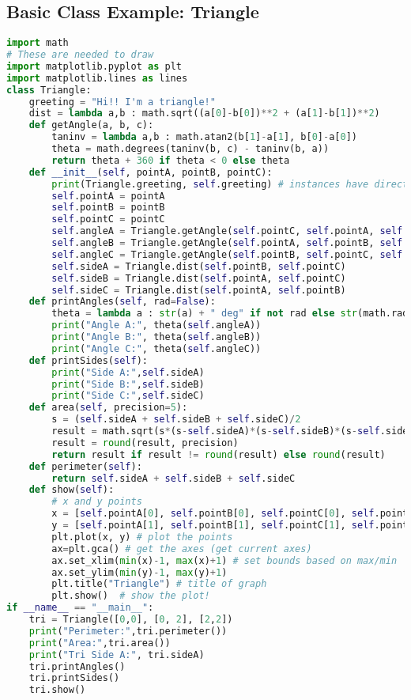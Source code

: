 \documentclass[12pt, twoside, reqno]{book}
\begin{document}
\subsection{Basic Class Example: Triangle}
\begin{lstlisting}[language=Python]
import math
# These are needed to draw
import matplotlib.pyplot as plt 
import matplotlib.lines as lines
class Triangle:
    greeting = "Hi!! I'm a triangle!"
    dist = lambda a,b : math.sqrt((a[0]-b[0])**2 + (a[1]-b[1])**2)
    def getAngle(a, b, c):
        taninv = lambda a,b : math.atan2(b[1]-a[1], b[0]-a[0])
        theta = math.degrees(taninv(b, c) - taninv(b, a))
        return theta + 360 if theta < 0 else theta
    def __init__(self, pointA, pointB, pointC):
        print(Triangle.greeting, self.greeting) # instances have direct access to class variables
        self.pointA = pointA
        self.pointB = pointB
        self.pointC = pointC
        self.angleA = Triangle.getAngle(self.pointC, self.pointA, self.pointB)
        self.angleB = Triangle.getAngle(self.pointA, self.pointB, self.pointC)
        self.angleC = Triangle.getAngle(self.pointB, self.pointC, self.pointA)
        self.sideA = Triangle.dist(self.pointB, self.pointC)
        self.sideB = Triangle.dist(self.pointA, self.pointC)
        self.sideC = Triangle.dist(self.pointA, self.pointB)
    def printAngles(self, rad=False):
        theta = lambda a : str(a) + " deg" if not rad else str(math.radians(a)) + " rad"
        print("Angle A:", theta(self.angleA))
        print("Angle B:", theta(self.angleB))
        print("Angle C:", theta(self.angleC))
    def printSides(self):
        print("Side A:",self.sideA)
        print("Side B:",self.sideB)
        print("Side C:",self.sideC)
    def area(self, precision=5):
        s = (self.sideA + self.sideB + self.sideC)/2
        result = math.sqrt(s*(s-self.sideA)*(s-self.sideB)*(s-self.sideC))
        result = round(result, precision)
        return result if result != round(result) else round(result)
    def perimeter(self):
        return self.sideA + self.sideB + self.sideC
    def show(self):        
        # x and y points
        x = [self.pointA[0], self.pointB[0], self.pointC[0], self.pointA[0]]
        y = [self.pointA[1], self.pointB[1], self.pointC[1], self.pointA[1]]
        plt.plot(x, y) # plot the points
        ax=plt.gca() # get the axes (get current axes)
        ax.set_xlim(min(x)-1, max(x)+1) # set bounds based on max/min
        ax.set_ylim(min(y)-1, max(y)+1)
        plt.title("Triangle") # title of graph
        plt.show()  # show the plot!
if __name__ == "__main__":
    tri = Triangle([0,0], [0, 2], [2,2])
    print("Perimeter:",tri.perimeter())
    print("Area:",tri.area())
    print("Tri Side A:", tri.sideA)
    tri.printAngles()
    tri.printSides()
    tri.show()
\end{lstlisting}
\end{document}
